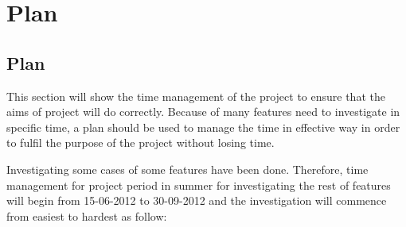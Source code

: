 \documentclass[11pt,]{report}
\begin{document}
\chapter{Plan}
\section{Plan}
\label{section: plan}

This section will show the time management of the project to ensure that the aims of project will do correctly.  Because of many features need to investigate in specific time, a plan should be used to manage the time in effective way in order to fulfil the purpose of the project without losing time.

Investigating some cases of some features have been done. Therefore, time management for project period in summer for investigating the rest of features will begin from 15-06-2012 to 30-09-2012 and the investigation will commence from easiest to hardest as follow:
\end{document}
